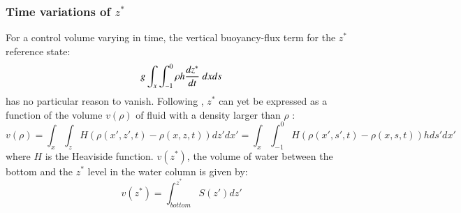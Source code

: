 
\subsubsection{Time variations of $z^*$}
For a control volume varying in time, the vertical buoyancy-flux term for the $z^*$ reference state:
\begin{equation}
g\int_{x} \int_{-1}^0 \rho h \frac{d z^*}{d t}\ dx ds \\
\end{equation}
has no particular reason to vanish.
Following \cite{huang_mixing_1998}, $z^*$ can yet be expressed as a function of the volume $v(\rho)$ of fluid with a density larger than $\rho$ :
\begin{equation}
v(\rho)=\int_x\int_z H(\rho(x',z',t)-\rho(x,z,t))dz'dx' = \int_x\int_{-1}^0 H(\rho(x',s',t)-\rho(x,s,t))h ds'dx'
\end{equation}
where $H$ is the Heaviside function. $v(z^*)$, the volume of water between the bottom and the $z^*$ level in the water column is given by:
\begin{equation}
v(z^*)=\int^{z^*}_{bottom} S(z')dz'
\end{equation}

